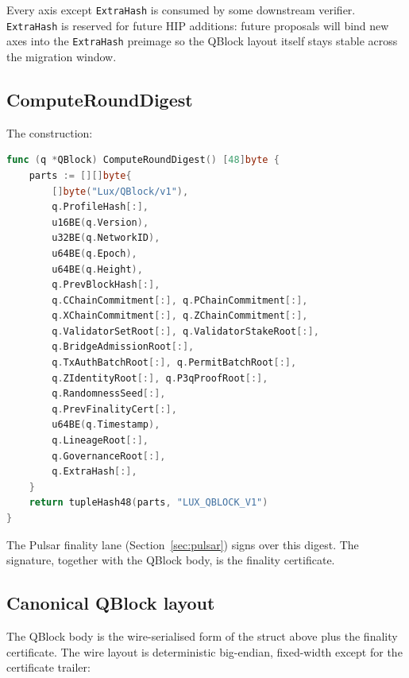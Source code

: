 Every axis except \texttt{ExtraHash} is consumed by some downstream
verifier. \texttt{ExtraHash} is reserved for future HIP additions: future
proposals will bind new axes into the \texttt{ExtraHash} preimage so the
QBlock layout itself stays stable across the migration window.

\subsection{ComputeRoundDigest}

The construction:

\begin{lstlisting}[language=Go,caption={\texttt{ComputeRoundDigest} for
QBlock. Source: \texttt{luxfi/consensus@12097034},
\texttt{protocol/qchain/round\_digest.go}.}]
func (q *QBlock) ComputeRoundDigest() [48]byte {
    parts := [][]byte{
        []byte("Lux/QBlock/v1"),
        q.ProfileHash[:],
        u16BE(q.Version),
        u32BE(q.NetworkID),
        u64BE(q.Epoch),
        u64BE(q.Height),
        q.PrevBlockHash[:],
        q.CChainCommitment[:], q.PChainCommitment[:],
        q.XChainCommitment[:], q.ZChainCommitment[:],
        q.ValidatorSetRoot[:], q.ValidatorStakeRoot[:],
        q.BridgeAdmissionRoot[:],
        q.TxAuthBatchRoot[:], q.PermitBatchRoot[:],
        q.ZIdentityRoot[:], q.P3qProofRoot[:],
        q.RandomnessSeed[:],
        q.PrevFinalityCert[:],
        u64BE(q.Timestamp),
        q.LineageRoot[:],
        q.GovernanceRoot[:],
        q.ExtraHash[:],
    }
    return tupleHash48(parts, "LUX_QBLOCK_V1")
}
\end{lstlisting}

The Pulsar finality lane (Section~\ref{sec:pulsar}) signs over this
digest. The signature, together with the QBlock body, is the finality
certificate.

\subsection{Canonical QBlock layout}

The QBlock body is the wire-serialised form of the struct above plus the
finality certificate. The wire layout is deterministic big-endian, fixed-width
except for the certificate trailer:

